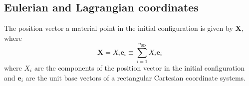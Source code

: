 \documentclass[conference]{IEEEtran}
\theoremstyle{definition}
\theoremstyle{remark}
\begin{document}
    \subsection{Eulerian and Lagrangian coordinates}
    The position vector a material point in the initial configuration is given by $\mathbf{X}$, where
    \begin{equation}
        \mathbf{X} = X_i \mathbf{e}_i \equiv \sum_{i = 1}^{n_{\mathrm{SD}}} X_i \mathbf{e}_i
    \end{equation}
    where $X_i$ are the components of the position vector in the initial configuration and $\mathbf{e}_i$ are the unit base vectors of a rectangular Cartesian coordinate systems.
\end{document}
